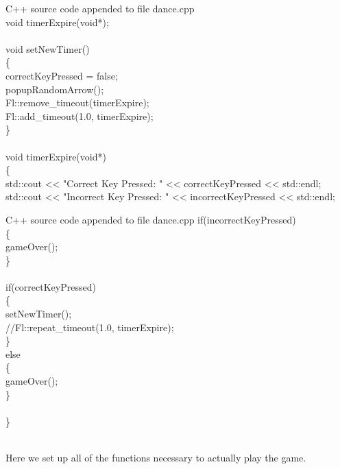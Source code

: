 \documentclass {article}
\begin{document}
\begin{GFT}{C++ source code appended to file dance.cpp}
\+\\
\+void timerExpire(void*);\\
\+\\
\+void setNewTimer()\\
\+\{\\
\+	correctKeyPressed = false;\\
\+	popupRandomArrow();\\
\+	Fl::remove\_timeout(timerExpire);\\
\+	Fl::add\_timeout(1.0, timerExpire);\\
\+\}\\
\+\\
\+void timerExpire(void*)\\
\+\{\\
\+	std::cout << "Correct Key Pressed: " << correctKeyPressed << std::endl;\\
\+		std::cout << "Incorrect Key Pressed: " << incorrectKeyPressed << std::endl;\\
\end{GFT}
\clearpage
\begin{GFT}{C++ source code appended to file dance.cpp}
\+	if(incorrectKeyPressed)\\
\+	\{\\
\+		gameOver();\\
\+	\}\\
\+\\
\+	if(correctKeyPressed)\\
\+	\{\\
\+ 		setNewTimer();\\
\+		//Fl::repeat\_timeout(1.0, timerExpire);\\
\+	\}\\
\+	else\\
\+	\{	\\
\+		gameOver();\\
\+	\}\\
\+	\\
\+\}\\
\+\\
\end{GFT}
\clearpage
Here we set up all of the functions necessary to actually play the game.
\end{document}
